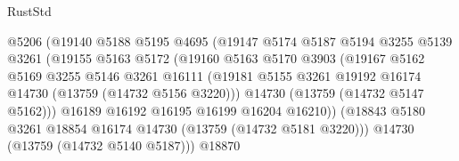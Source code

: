 \begin{lexlean}{RustStd}
\begin{coremodule}
                                    @5206
                                    (@19140
                                      @5188
                                      @5195
                                      @4695
                                      (@19147
                                        @5174
                                        @5187
                                        @5194
                                        @3255
                                        @5139
                                        @3261
                                        (@19155
                                          @5163
                                          @5172
                                          (@19160
                                            @5163
                                            @5170
                                            @3903
                                            (@19167
                                              @5162
                                              @5169
                                              @3255
                                              @5146
                                              @3261
                                              @16111
                                              (@19181
                                                @5155
                                                @3261
                                                @19192
                                                @16174
                                                @14730
                                                (@13759 (@14732 @5156 @3220)))
                                              @14730
                                              (@13759 (@14732 @5147 @5162)))
                                            @16189
                                            @16192
                                            @16195
                                            @16199
                                            @16204
                                            @16210))
                                        (@18843
                                          @5180
                                          @3261
                                          @18854
                                          @16174
                                          @14730
                                          (@13759 (@14732 @5181 @3220)))
                                        @14730
                                        (@13759 (@14732 @5140 @5187)))
                                      @18870

\end{coremodule}
\end{lexlean}
